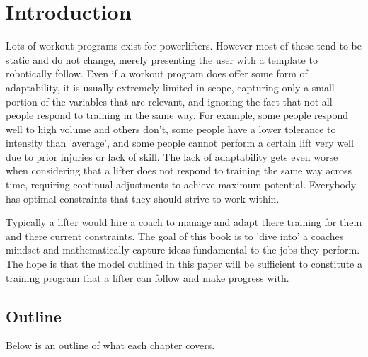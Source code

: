 \chapter{Introduction}
\label{sec:Introduction}

Lots of workout programs exist for powerlifters. However most of these tend to be static and do not change, merely presenting the user with a template to robotically follow. Even if a workout program does offer some form of adaptability, it is usually extremely limited in scope, capturing only a small portion of the variables that are relevant, and ignoring the fact that not all people respond to training in the same way. For example, some people respond well to high volume and others don't, some people have a lower tolerance to intensity than 'average', and some people cannot perform a certain lift very well due to prior injuries or lack of skill. The lack of adaptability gets even worse when considering that a lifter does not respond to training the same way across time, requiring continual adjustments to achieve maximum potential. Everybody has optimal constraints that they should strive to work within.

Typically a lifter would hire a coach to manage and adapt there training for them and there current constraints. The goal of this book is to 'dive into' a coaches mindset and mathematically capture ideas fundamental to the jobs they perform. The hope is that the model outlined in this paper will be sufficient to constitute a training program that a lifter can follow and make progress with.

\section{Outline}
\label{sec:Outline}

Below is an outline of what each chapter covers.

